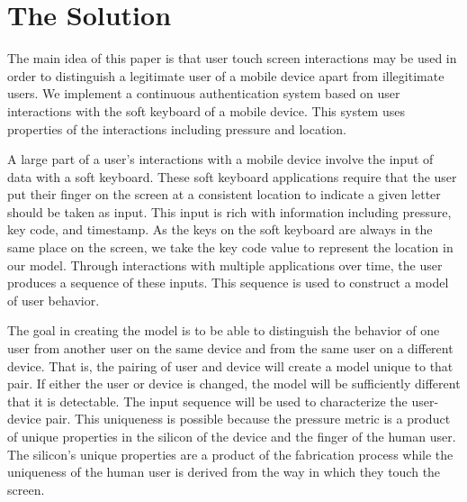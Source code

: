 \section{The Solution}
\label{the_solution}
The main idea of this paper is that user
%
touch screen interactions may be used in order to
distinguish a legitimate user of a mobile device apart from
illegitimate users.
%
We implement a continuous authentication system
based on user interactions with the soft keyboard of
a mobile device.
This system uses properties of the interactions including
pressure and location.

A large part of a user's interactions with a mobile
device involve the input of data with a soft keyboard.
These soft keyboard applications require that
the user put their finger on the screen at a consistent
location to indicate a given letter should be taken as input.
This input is rich with information including
pressure,
key code, and
timestamp.
As the keys on the soft keyboard are always in the same place on the screen,
we take the key code value to represent the location in our model.
Through interactions with multiple applications over time,
the user produces a sequence of these inputs.
This sequence is used to construct a model of user behavior.

The goal in creating the model
is to be able to distinguish the behavior
of one user from 
another user on the same device and
from the same user on a different device.
That is, the pairing of user and device will
create a model unique to that pair.
If either the user or device is changed,
the model will be sufficiently different
that it is detectable.
The input sequence will be used to characterize the user-device pair.
This uniqueness is possible because
the pressure metric is a product of 
unique properties in
the silicon of the device and
the finger of the human user.
The silicon's unique properties
are a product of the fabrication process while %
the uniqueness of the human user is derived from
the way in which they touch the screen.

